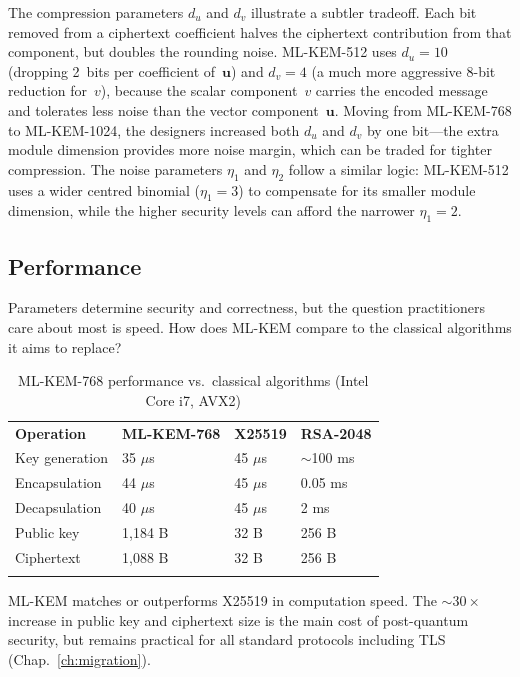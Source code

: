 The compression parameters $d_u$ and $d_v$ illustrate a subtler tradeoff.  Each bit removed from a ciphertext coefficient halves the ciphertext contribution from that component, but doubles the rounding noise.  ML-KEM-512 uses $d_u = 10$ (dropping 2~bits per coefficient of~$\mathbf{u}$) and $d_v = 4$ (a much more aggressive 8-bit reduction for~$v$), because the scalar component~$v$ carries the encoded message and tolerates less noise than the vector component~$\mathbf{u}$.  Moving from ML-KEM-768 to ML-KEM-1024, the designers increased both $d_u$ and $d_v$ by one bit---the extra module dimension provides more noise margin, which can be traded for tighter compression.  The noise parameters $\eta_1$ and $\eta_2$ follow a similar logic: ML-KEM-512 uses a wider centred binomial ($\eta_1 = 3$) to compensate for its smaller module dimension, while the higher security levels can afford the narrower $\eta_1 = 2$.


\subsection{Performance}
\label{subsec:mlkem-performance}

Parameters determine security and correctness, but the question practitioners care about most is speed.  How does ML-KEM compare to the classical algorithms it aims to replace?

\begin{table}[t]
\caption{ML-KEM-768 performance vs.\ classical algorithms (Intel Core i7, AVX2)}
\label{tab:mlkem-perf}
\begin{tabular}{p{3cm}p{2cm}p{2cm}p{2cm}}
\hline\noalign{\smallskip}
\textbf{Operation} & \textbf{ML-KEM-768} & \textbf{X25519} & \textbf{RSA-2048} \\
\noalign{\smallskip}\svhline\noalign{\smallskip}
Key generation   & 35 $\mu$s  & 45 $\mu$s  & $\sim$100 ms \\
Encapsulation    & 44 $\mu$s  & 45 $\mu$s  & 0.05 ms \\
Decapsulation    & 40 $\mu$s  & 45 $\mu$s  & 2 ms \\
Public key       & 1,184 B    & 32 B       & 256 B \\
Ciphertext       & 1,088 B    & 32 B       & 256 B \\
\noalign{\smallskip}\hline
\end{tabular}
\end{table}

ML-KEM matches or outperforms X25519 in computation speed.  The $\sim 30\times$ increase in public key and ciphertext size is the main cost of post-quantum security, but remains practical for all standard protocols including TLS (Chap.~\ref{ch:migration}).


